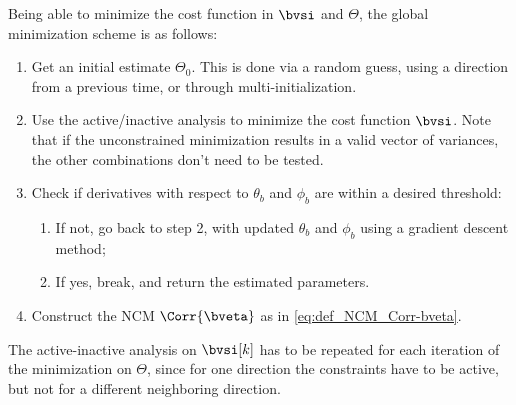 Being able to minimize the cost function in $\bvsi$ and $\Theta$, the global minimization scheme is as follows:
\begin{enumerate}
	\item Get an initial estimate $\Theta_0$. This is done via a random guess, using a direction from a previous time, or through multi-initialization.
	\item Use the active/inactive analysis to minimize the cost function $\bvsi$. Note that if the unconstrained minimization results in a valid vector of variances, the other combinations don't need to be tested.
	\item Check if derivatives with respect to $\theta_b$ and $\phi_b$ are within a desired threshold:
	\begin{enumerate}
		\item If not, go back to step 2, with updated $\theta_b$ and $\phi_b$ using a gradient descent method;
		\item If yes, break, and return the estimated parameters.
	\end{enumerate}
	\item Construct the NCM $\Corr{\bveta}$ as in \cref{eq:def_NCM_Corr-bveta}.
\end{enumerate}

The active-inactive analysis on $\bvsi[k]$ has to be repeated for each iteration of the minimization on $\Theta$, since for one direction the constraints have to be active, but not for a different neighboring direction.

